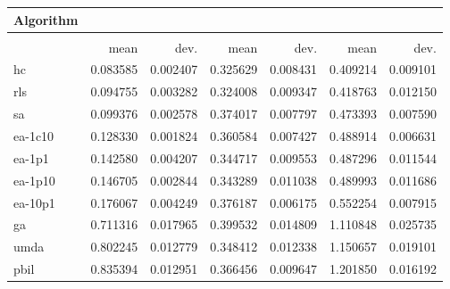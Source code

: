 \begin{tabular}{@{} l *{6}{>{{}}N{1}{2}} @{}}
\toprule
{Algorithm} &  \\
\midrule
&  &  &  \\
\midrule
& {mean} & {dev.} & {mean} & {dev.} & {mean} & {dev.} \\
\midrule
hc & 0.083585 & 0.002407 & 0.325629 & 0.008431 & 0.409214 & 0.009101 \\
rls & 0.094755 & 0.003282 & 0.324008 & 0.009347 & 0.418763 & 0.012150 \\
sa & 0.099376 & 0.002578 & 0.374017 & 0.007797 & 0.473393 & 0.007590 \\
ea-1c10 & 0.128330 & 0.001824 & 0.360584 & 0.007427 & 0.488914 & 0.006631 \\
ea-1p1 & 0.142580 & 0.004207 & 0.344717 & 0.009553 & 0.487296 & 0.011544 \\
ea-1p10 & 0.146705 & 0.002844 & 0.343289 & 0.011038 & 0.489993 & 0.011686 \\
ea-10p1 & 0.176067 & 0.004249 & 0.376187 & 0.006175 & 0.552254 & 0.007915 \\
ga & 0.711316 & 0.017965 & 0.399532 & 0.014809 & 1.110848 & 0.025735 \\
umda & 0.802245 & 0.012779 & 0.348412 & 0.012338 & 1.150657 & 0.019101 \\
pbil & 0.835394 & 0.012951 & 0.366456 & 0.009647 & 1.201850 & 0.016192 \\
\bottomrule
\end{tabular}
